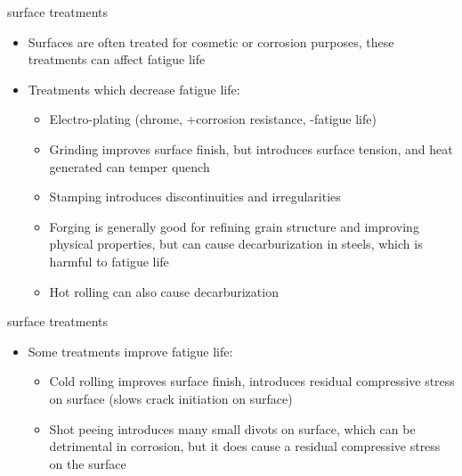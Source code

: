 \documentclass[10pt]{beamer}
\begin{document}
\begin{frame}{surface treatments}
	\begin{itemize}[<+->]
		\item Surfaces are often treated for cosmetic or corrosion purposes, these treatments can affect fatigue life
		\item Treatments which decrease fatigue life:
		\begin{itemize}
			\item Electro-plating (chrome, +corrosion resistance, -fatigue life)
			\item Grinding improves surface finish, but introduces surface tension, and heat generated can temper quench
			\item Stamping introduces discontinuities and irregularities
			\item Forging is generally good for refining grain structure and improving physical properties, but can cause decarburization in steels, which is harmful to fatigue life
			\item Hot rolling can also cause decarburization
		\end{itemize}
	\end{itemize}
\end{frame}

\begin{frame}{surface treatments}
	\begin{itemize}[<+->]
		\item Some treatments improve fatigue life:
		\begin{itemize}
			\item Cold rolling improves surface finish, introduces residual compressive stress on surface (slows crack initiation on surface)
			\item Shot peeing introduces many small divots on surface, which can be detrimental in corrosion, but it does cause a residual compressive stress on the surface
		\end{itemize}
	\end{itemize}
\end{frame}
\end{document}
